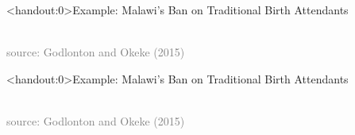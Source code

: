 \documentclass[10pt,xcolor=table,ignorenonframetext,aspectratio=169]{beamer}
\begin{document}
\begin{frame}<handout:0>{Example:  Malawi's Ban on Traditional Birth Attendants}

\medskip
\begin{center}
	 \\
	\textcolor{gray}{\tiny{source:  Godlonton and Okeke (2015)}}
\end{center}

\end{frame}



\begin{frame}<handout:0>{Example:  Malawi's Ban on Traditional Birth Attendants}

\medskip
\begin{center}
	 \\
	\textcolor{gray}{\tiny{source:  Godlonton and Okeke (2015)}}
\end{center}

\end{frame}


\end{document}
